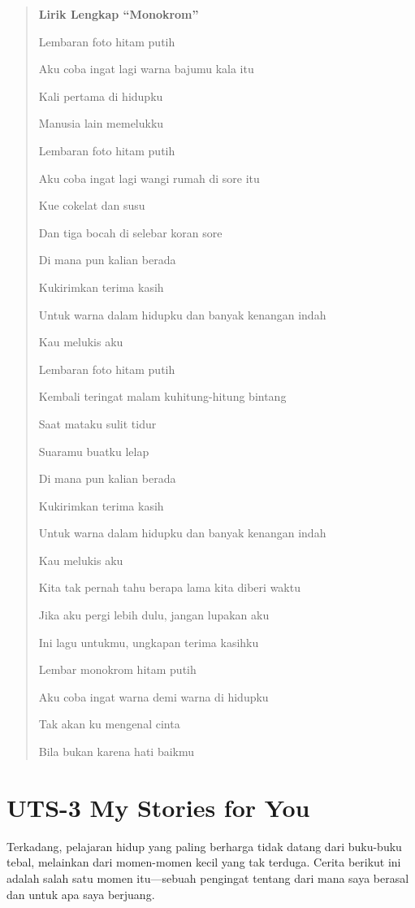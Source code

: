 \documentclass[
  letterpaper,
  DIV=11,
  numbers=noendperiod]{scrreprt}
\begin{document}
\begin{quote}
\textbf{Lirik Lengkap ``Monokrom''}

Lembaran foto hitam putih

Aku coba ingat lagi warna bajumu kala itu

Kali pertama di hidupku

Manusia lain memelukku

Lembaran foto hitam putih

Aku coba ingat lagi wangi rumah di sore itu

Kue cokelat dan susu

Dan tiga bocah di selebar koran sore

Di mana pun kalian berada

Kukirimkan terima kasih

Untuk warna dalam hidupku dan banyak kenangan indah

Kau melukis aku

Lembaran foto hitam putih

Kembali teringat malam kuhitung-hitung bintang

Saat mataku sulit tidur

Suaramu buatku lelap

Di mana pun kalian berada

Kukirimkan terima kasih

Untuk warna dalam hidupku dan banyak kenangan indah

Kau melukis aku

Kita tak pernah tahu berapa lama kita diberi waktu

Jika aku pergi lebih dulu, jangan lupakan aku

Ini lagu untukmu, ungkapan terima kasihku

Lembar monokrom hitam putih

Aku coba ingat warna demi warna di hidupku

Tak akan ku mengenal cinta

Bila bukan karena hati baikmu
\end{quote}


\chapter{UTS-3 My Stories for You}\label{uts-3-my-stories-for-you}

Terkadang, pelajaran hidup yang paling berharga tidak datang dari
buku-buku tebal, melainkan dari momen-momen kecil yang tak terduga.
Cerita berikut ini adalah salah satu momen itu---sebuah pengingat
tentang dari mana saya berasal dan untuk apa saya berjuang.
\end{document}
